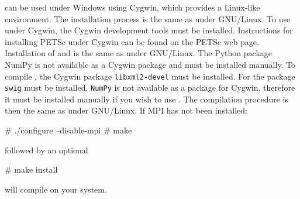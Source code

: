 \dolfin{} can be used under Windows using Cygwin, which provides a Linux-like
environment. The installation process is the same as under GNU/Linux. 
To use \dolfin{} under Cygwin, the Cygwin development tools must be installed. 
Instructions for installing PETSc under Cygwin can be found on the  PETSc web 
page. Installation of \ffc{} and \fiat{} is the same as under GNU/Linux. The 
Python package NumPy is not available as a Cygwin package and must be 
installed manually. To compile \dolfin{}, the Cygwin package  
\texttt{libxml2-devel} must be installed. For \pydolfin{} the 
package \texttt{swig} must be installed. \texttt{NumPy} is not available as 
a package for Cygwin, therefore it must be installed manually if you wish to 
use \pydolfin{}.
The compilation procedure is then the
same as under GNU/Linux. If MPI has not been installed:
\begin{code}
# ./configure --disable-mpi
# make
\end{code}
followed by an optional
\begin{code}
# make install
\end{code}
will compile \dolfin{} on your system.
